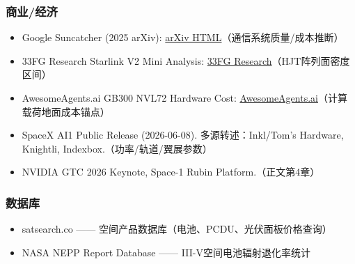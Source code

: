 \subsubsection{商业/经济}

\begin{itemize}
  \item Google Suncatcher (2025 arXiv): \href{https://arxiv.org/html/2511.19468v1}{arXiv HTML}（通信系统质量/成本推断）
  \item 33FG Research Starlink V2 Mini Analysis: \href{https://research.33fg.com/analysis/starlink-v2-mini-optimized-lighter-satellites-more-bandwidth-per-launch}{33FG Research}（HJT阵列面密度区间）
  \item AwesomeAgents.ai GB300 NVL72 Hardware Cost: \href{https://awesomeagents.ai/hardware/nvidia-gb300-nvl72/}{AwesomeAgents.ai}（计算载荷地面成本锚点）
  \item SpaceX AI1 Public Release (2026-06-08). 多源转述：Inkl/Tom's Hardware, Knightli, Indexbox.（功率/轨道/翼展参数）
  \item NVIDIA GTC 2026 Keynote, Space-1 Rubin Platform.（正文第4章）
\end{itemize}

\subsubsection{数据库}

\begin{itemize}
  \item satsearch.co —— 空间产品数据库（电池、PCDU、光伏面板价格查询）
  \item NASA NEPP Report Database —— III-V空间电池辐射退化率统计
\end{itemize}
\endgroup
